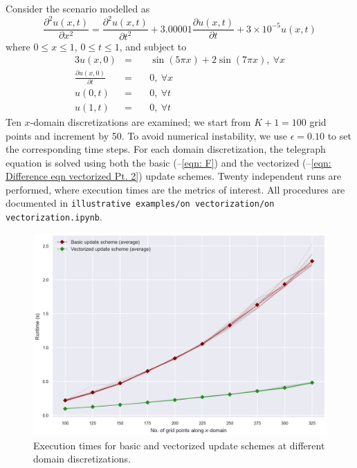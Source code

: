 \documentclass{article}
\begin{document}
Consider the scenario modelled as
\begin{equation}
   \label{eqn: Telegraph eqn for On Vectorization}
   \frac{\partial^{2} u \left(x,t\right)}{\partial x^{2}}
   =
   \frac{\partial^{2} u \left(x,t\right)}{\partial t^{2}}
   +
   3.00001 \frac{\partial u \left(x,t\right)}{\partial t}
   +
   3 \times 10^{-5} u \left(x,t\right)
\end{equation}
where $0 \leq x \leq 1$, $0 \leq t \leq 1$,
and subject to
\begin{alignat}{3}
   \label{eqn: mu for On Vectorization}
   u \left(x,0\right) &=\ && \sin \left(5 \pi x\right) + 2 \sin \left(7 \pi x\right),\ \forall x \\
   \label{eqn: xi for On Vectorization}
   \frac{\partial u \left(x,0\right)}{\partial t} &=\ && 0,\ \forall x \\
   \label{eqn: nu_0 for On Vectorization}
   u \left(0,t\right) &=\ && 0,\ \forall t \\
   \label{eqn: nu_X for On Vectorization}
   u \left(1,t\right) &=\ && 0,\ \forall t
\end{alignat}
Ten $x$-domain discretizations are examined;
we start from $K+1=100$ grid points and increment by 50.
To avoid numerical instability, we use $\epsilon = 0.10$ to set the corresponding time steps.
For each domain discretization, the telegraph equation is solved using both
the basic (--\ref{eqn: F})
and the vectorized (--\ref{eqn: Difference eqn vectorized Pt. 2}) update schemes.
Twenty independent runs are performed, where execution times are the metrics of interest.
All procedures are documented in
{\tt illustrative examples/on vectorization/on vectorization.ipynb}.

\begin{figure}[t!]
   \centering
   \includegraphics[scale=0.7]{on vectorization.png}
   \caption{Execution times for basic and vectorized update schemes at different domain discretizations.}
	\label{fig: On Vectorization results}
\end{figure}
\end{document}
